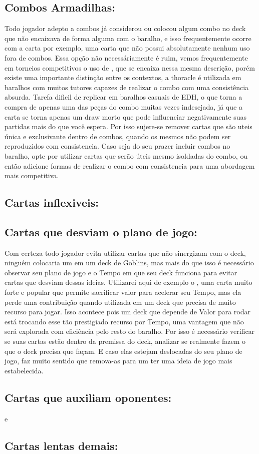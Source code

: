 \subsection{Combos Armadilhas:}
Todo jogador adepto a combos já considerou ou colocou algum combo no deck que não encaixava de forma alguma com o baralho, e isso frequentemente ocorre com a carta  por exemplo, uma carta que não possui absolutamente nenhum uso fora de combos.
Essa opção não necessáriamente é ruim, vemos frequentemente em torneios competitivos o uso de , que se encaixa nessa mesma descrição, porém existe uma importante distinção entre os contextos, a thoracle é utilizada em baralhos com muitos tutores capazes de realizar o combo com uma consistência absurda.
Tarefa dificil de replicar em baralhos casuais de EDH, o que torna a compra de apenas uma das peças do combo muitas vezes indesejada, já que a carta se torna apenas um draw morto que pode influenciar negativamente suas partidas mais do que você espera.
Por isso sujere-se remover cartas que são uteis única e exclusivante dentro de combos, quando os mesmos não podem ser reproduzidos com consistencia.
Caso seja do seu prazer incluir combos no baralho, opte por utilizar cartas que serão úteis mesmo isoldadas do combo, ou então adicione formas de realizar o combo com consistencia para uma abordagem mais competitiva.


\subsection{Cartas inflexiveis:}
\card{}

\subsection{Cartas que desviam o plano de jogo:}
Com certeza todo jogador evita utilizar cartas que não sinergizam com o deck, ninguém colocaria um  em um deck de Goblins, mas mais do que isso é necessário observar seu plano de jogo e o Tempo em que seu deck funciona para evitar cartas que desviam dessas ideias.
Utilizarei aqui de exemplo o , uma carta muito forte e popular que permite sacrificar valor para acelerar seu Tempo, mas ela perde uma contribuição quando utilizada em um deck que precisa de muito recurso para jogar.
Isso acontece pois um deck que depende de Valor para rodar está trocando esse tão prestigiado recurso por Tempo, uma vantagem que não será explorada com eficiência pelo resto do baralho. Por isso é necessário verificar se suas cartas estão dentro da premissa do deck, analizar se realmente fazem o que o deck precisa que façam.
E caso elas estejam deslocadas do seu plano de jogo, faz muito sentido que remova-as para um ter uma ideia de jogo mais estabelecida.


\subsection{Cartas que auxiliam oponentes:}
 e 

\subsection{Cartas lentas demais:}

